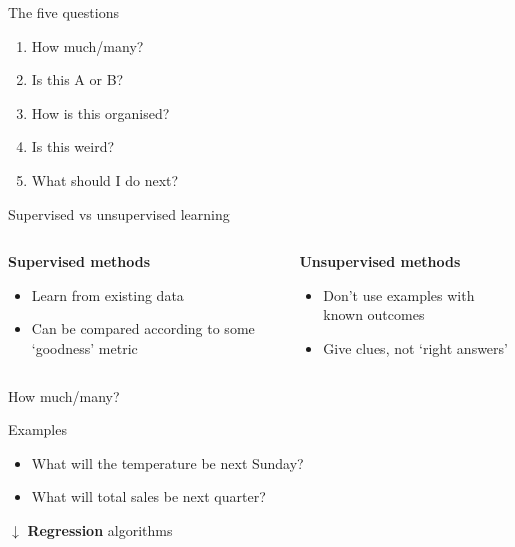 \begin{frame}{The five questions}
    \begin{enumerate}
        \item How much/many?
        \item Is this A or B?
        \item How is this organised?
        \item Is this weird?
        \item What should I do next?
    \end{enumerate}
\end{frame}

\begin{frame}{Supervised vs unsupervised learning}
    \begin{columns}
        \begin{column}{0.5\textwidth}
            \begin{center}
                \large\bf%
                Supervised methods
            \end{center}
            \begin{itemize}
                \item Learn from existing data
                \item Can be compared according to some `goodness' metric
            \end{itemize}
        \end{column}
        \begin{column}{0.5\textwidth}
            \begin{center}
                \large\bf%
                Unsupervised methods
            \end{center}
            \begin{itemize}
                \item Don't use examples with known outcomes
                \item Give clues, not `right answers'
            \end{itemize}
        \end{column}
    \end{columns}
\end{frame}

\begin{frame}{How much/many?}
    \begin{block}{Examples}
        \begin{itemize}
            \item What will the temperature be next Sunday?
            \item What will total sales be next quarter?
        \end{itemize}
    \end{block}
    \begin{center}
        \large%
        $\downarrow$
        \vfill
        \textbf{Regression} algorithms
    \end{center}
\end{frame}

